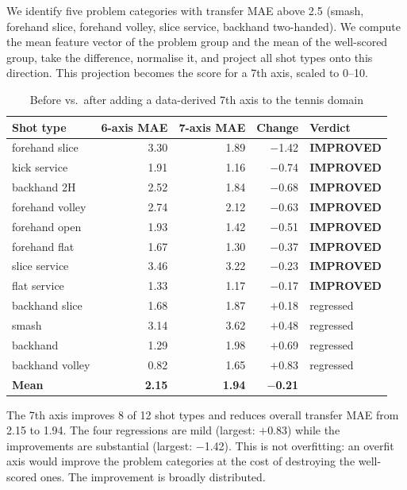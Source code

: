 \documentclass[11pt]{article}
\begin{document}
We identify five problem categories with transfer MAE above 2.5 (smash, forehand slice, forehand volley, slice service, backhand two-handed). We compute the mean feature vector of the problem group and the mean of the well-scored group, take the difference, normalise it, and project all shot types onto this direction. This projection becomes the score for a 7th axis, scaled to 0--10.

\begin{table}[ht]
\centering
\caption{Before vs.\ after adding a data-derived 7th axis to the tennis domain}
\begin{tabular}{lrrrl}
\toprule
Shot type & 6-axis MAE & 7-axis MAE & Change & Verdict \\
\midrule
forehand slice & 3.30 & 1.89 & $-$1.42 & \textbf{IMPROVED} \\
kick service & 1.91 & 1.16 & $-$0.74 & \textbf{IMPROVED} \\
backhand 2H & 2.52 & 1.84 & $-$0.68 & \textbf{IMPROVED} \\
forehand volley & 2.74 & 2.12 & $-$0.63 & \textbf{IMPROVED} \\
forehand open & 1.93 & 1.42 & $-$0.51 & \textbf{IMPROVED} \\
forehand flat & 1.67 & 1.30 & $-$0.37 & \textbf{IMPROVED} \\
slice service & 3.46 & 3.22 & $-$0.23 & \textbf{IMPROVED} \\
flat service & 1.33 & 1.17 & $-$0.17 & \textbf{IMPROVED} \\
backhand slice & 1.68 & 1.87 & $+$0.18 & regressed \\
smash & 3.14 & 3.62 & $+$0.48 & regressed \\
backhand & 1.29 & 1.98 & $+$0.69 & regressed \\
backhand volley & 0.82 & 1.65 & $+$0.83 & regressed \\
\midrule
\textbf{Mean} & \textbf{2.15} & \textbf{1.94} & $-$\textbf{0.21} & \\
\bottomrule
\end{tabular}
\label{tab:axis_discovery}
\end{table}

The 7th axis improves 8 of 12 shot types and reduces overall transfer MAE from 2.15 to 1.94. The four regressions are mild (largest: $+$0.83) while the improvements are substantial (largest: $-$1.42). This is not overfitting: an overfit axis would improve the problem categories at the cost of destroying the well-scored ones. The improvement is broadly distributed.
\end{document}
